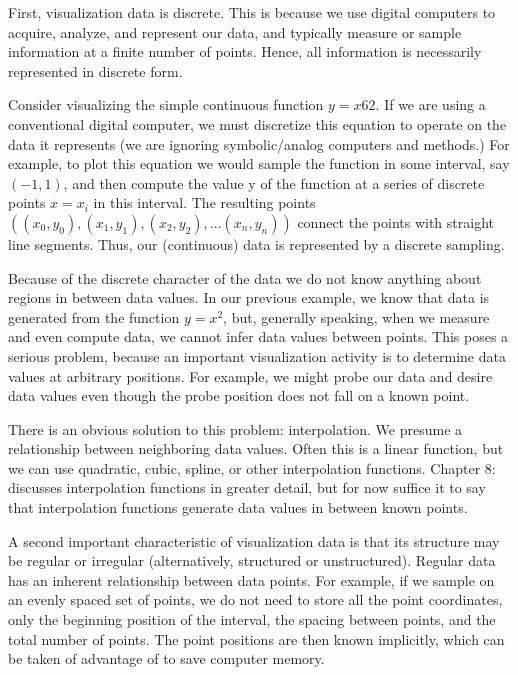 First, visualization data is discrete. This is because we use digital computers to acquire, analyze, and represent our data, and typically measure or sample information at a finite number of points. Hence, all information is necessarily represented in discrete form. 

Consider visualizing the simple continuous function $y = x6 2$. If we are using a conventional digital computer, we must discretize this equation to operate on the data it represents (we are ignoring symbolic/analog computers and methods.) For example, to plot this equation we would sample the function in some interval, say $(-1,1)$, and then compute the value y of the function at a series of discrete points $x = x_i$ in this interval. The resulting points $((x_0,y_0), (x_1,y_1), (x_2,y_2), ... (x_n,y_n))$ connect the points with straight line segments. Thus, our (continuous) data is represented by a discrete sampling.

Because of the discrete character of the data we do not know anything about regions in between data values. In our previous example, we know that data is generated from the function $y = x^2$, but, generally speaking, when we measure and even compute data, we cannot infer data values between points. This poses a serious problem, because an important visualization activity is to determine data values at arbitrary positions. For example, we might probe our data and desire data values even though the probe position does not fall on a known point.

There is an obvious solution to this problem: interpolation. We presume a relationship between neighboring data values. Often this is a linear function, but we can use quadratic, cubic, spline, or other interpolation functions. Chapter 8:  discusses interpolation functions in greater detail, but for now suffice it to say that interpolation functions generate data values in between known points.

A second important characteristic of visualization data is that its structure may be regular or irregular (alternatively, structured or unstructured). Regular data has an inherent relationship between data points. For example, if we sample on an evenly spaced set of points, we do not need to store all the point coordinates, only the beginning position of the interval, the spacing between points, and the total number of points. The point positions are then known implicitly, which can be taken of advantage of to save computer memory.

